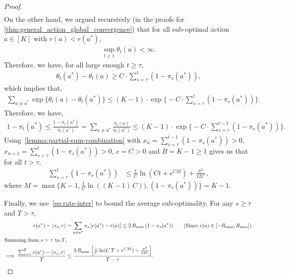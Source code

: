 \begin{proof}
\begin{align}
\end{align}
On the other hand, we argued recursively (in the proofs for \cref{thm:general_action_global_convergence})  that for all sub-optimal action $a \in [K]$ with $r(a) < r(a^*)$,
\begin{align}
    \sup_{t \ge 1} \theta_t(a) < \infty.
\end{align}
Therefore, we have, for all large enough $t \ge \tau$,
\begin{align}
    \theta_t(a^*) - \theta_t(a) \ge C \cdot \sum_{s=\tau}^{t}{(1 - \pi_s(a^*))},
\end{align}
which implies that,
\begin{align}
    \sum_{a \neq a^*}{ \exp\{ \theta_t(a) - \theta_t(a^*) \}} \le (K - 1) \cdot \exp\bigg\{ - C \cdot \sum_{s=\tau}^{t}{(1 - \pi_s(a^*))} \bigg\}.
\end{align}
Therefore, we have,
\begin{align}
    1 - \pi_t(a^*) \le \frac{1 - \pi_t(a^*)}{\pi_t(a^*)} = \sum_{a \neq a^*}{ \frac{\pi_t(a)}{\pi_t(a^*)}} \le (K - 1) \cdot \exp\bigg\{ - C \cdot \sum_{s=\tau}^{t-1}{(1 - \pi_s(a^*))} \bigg\}.
\end{align} 
Using~\cref{lemma:partial-sum-combination} with $x_n = \sum_{s=\tau}^{t-1}{(1 - \pi_s(a^*))} > 0$, $x_{n+1} = \sum_{s=\tau}^{t}{(1 - \pi_s(a^*))} > 0$, $c = C > 0$ and $B = K - 1 \geq 1$ gives us that for all $t > \tau$, 
\begin{align}
\sum_{s=\tau}^{t}{(1 - \pi_s(a^*))} & \leq \frac1{C} \ln(C t + e^{C M} ) + \frac{\pi^2}{12C} \,,
\label{eq:rate-inter}
\end{align}
where $M = \max\{K - 1, \frac{1}{C} \ln ((K - 1) \, C)), (1 - \pi_\tau(a^*)) \} = K - 1$. 

Finally, we use~\cref{eq:rate-inter} to bound the average sub-optimality. For any $s \geq \tau$ and $T > \tau$,
\begin{align*}
r(a^*) - \langle \pi_s, r \rangle &= \sum_{a \neq a^*} \pi_{s} \, [r(a^*) - r(a)] \leq 2 \, R_{\max} \, (1 - \pi_s(a^*)) \tag{Since $r(a) \in [-R_{\max},R_{\max}]$}. \\
\intertext{Summing from $s = \tau$ to $T$,}
\implies \frac{\sum_{s=\tau}^{T} r(a^*) - \langle \pi_s, r \rangle}{T} & \leq \frac{2 \, R_{\max} \, \left[\frac1{C} \ln(C \, T + e^{C M} ) + \frac{\pi^2}{12C} \right]}{T - \tau}. \qedhere
\end{align*}
\end{proof}

